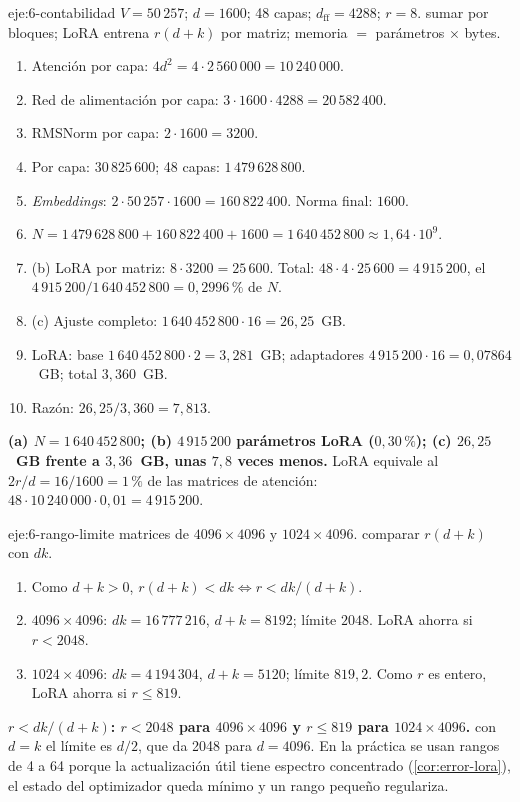 \begin{solucion}{eje:6-contabilidad}
\datos $V=50\,257$; $d=1600$; 48 capas; $d_{\mathrm{ff}}=4288$; $r=8$.
\planteamiento sumar por bloques; LoRA entrena $r(d+k)$ por matriz; memoria $=$ parámetros $\times$ bytes.
\pasos
\begin{enumerate}[label=\arabic*.]
  \item Atención por capa: $4d^{2}=4\cdot 2\,560\,000=10\,240\,000$.
  \item Red de alimentación por capa: $3\cdot 1600\cdot 4288=20\,582\,400$.
  \item RMSNorm por capa: $2\cdot 1600=3200$.
  \item Por capa: $30\,825\,600$; 48 capas: $1\,479\,628\,800$.
  \item \emph{Embeddings}: $2\cdot 50\,257\cdot 1600=160\,822\,400$. Norma final: $1600$.
  \item $N=1\,479\,628\,800+160\,822\,400+1600=1\,640\,452\,800\approx 1{,}64\cdot 10^{9}$.
  \item (b) LoRA por matriz: $8\cdot 3200=25\,600$. Total: $48\cdot 4\cdot 25\,600=4\,915\,200$, el $4\,915\,200/1\,640\,452\,800=0{,}2996\,\%$ de $N$.
  \item (c) Ajuste completo: $1\,640\,452\,800\cdot 16=26{,}25$~GB.
  \item LoRA: base $1\,640\,452\,800\cdot 2=3{,}281$~GB; adaptadores $4\,915\,200\cdot 16=0{,}07864$~GB; total $3{,}360$~GB.
  \item Razón: $26{,}25/3{,}360=7{,}813$.
\end{enumerate}
\resultado \textbf{(a) $N=1\,640\,452\,800$; (b) $4\,915\,200$ parámetros LoRA ($0{,}30\,\%$); (c) $26{,}25$~GB frente a $3{,}36$~GB, unas $7{,}8$ veces menos.}
\comprobacion LoRA equivale al $2r/d=16/1600=1\,\%$ de las matrices de atención: $48\cdot 10\,240\,000\cdot 0{,}01=4\,915\,200$.
\end{solucion}

\begin{solucion}{eje:6-rango-limite}
\datos matrices de $4096\times 4096$ y $1024\times 4096$.
\planteamiento comparar $r(d+k)$ con $dk$.
\pasos
\begin{enumerate}[label=\arabic*.]
  \item Como $d+k>0$, $r(d+k)<dk\iff r<dk/(d+k)$.
  \item $4096\times 4096$: $dk=16\,777\,216$, $d+k=8192$; límite $2048$. LoRA ahorra si $r<2048$.
  \item $1024\times 4096$: $dk=4\,194\,304$, $d+k=5120$; límite $819{,}2$. Como $r$ es entero, LoRA ahorra si $r\le 819$.
\end{enumerate}
\resultado \textbf{$r<dk/(d+k)$: $r<2048$ para $4096\times 4096$ y $r\le 819$ para $1024\times 4096$.}
\comprobacion con $d=k$ el límite es $d/2$, que da 2048 para $d=4096$. En la práctica se usan rangos de 4 a 64 porque la actualización útil tiene espectro concentrado (\cref{cor:error-lora}), el estado del optimizador queda mínimo y un rango pequeño regulariza.
\end{solucion}
